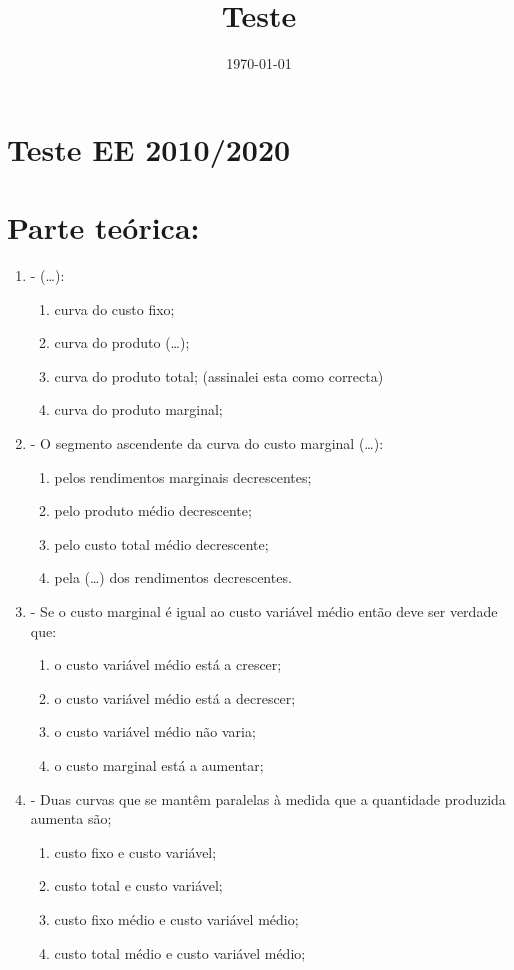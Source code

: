 \documentclass[11pt]{article}
\date{\today}
\title{Teste}
\begin{document}
\maketitle
\tableofcontents


\section{Teste EE 2010/2020}
\label{sec:org1274a27}
\section{Parte teórica:}
\label{sec:org44ad27d}

\begin{enumerate}
\item - (\ldots{}): 
\begin{enumerate}
\item curva do custo fixo;
\item curva do produto (\ldots{});
\item curva do produto total; (assinalei esta como correcta)
\item curva do produto marginal;
\end{enumerate}

\item - O segmento ascendente da curva do custo marginal (\ldots{}): 
\begin{enumerate}
\item pelos rendimentos marginais decrescentes;
\item pelo produto médio decrescente;
\item pelo custo total médio decrescente;
\item pela (\ldots{}) dos rendimentos decrescentes.
\end{enumerate}
\clearpage
\item - Se o custo marginal é igual ao custo variável médio então deve ser verdade que: 
\begin{enumerate}
\item o custo variável médio está a crescer;
\item o custo variável médio está a decrescer;
\item o custo variável médio não varia;
\item o custo marginal está a aumentar;
\end{enumerate}

\item - Duas curvas que se mantêm paralelas à medida que a quantidade produzida aumenta são; 
\begin{enumerate}
\item custo fixo e custo variável;
\item custo total e custo variável;
\item custo fixo médio e custo variável médio;
\item custo total médio e custo variável médio;
\end{enumerate}


\end{enumerate}
\end{document}
